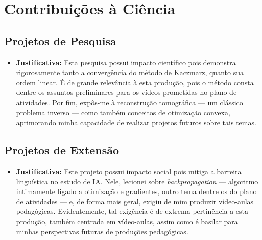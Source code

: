 \section{Contribuições à Ciência}
\subsection{Projetos de Pesquisa}
\begin{itemize}
	\item[$\bullet$]

	\textbf{Justificativa:}
	Esta pesquisa possui impacto científico pois demonstra rigorosamente tanto a convergência do método de Kaczmarz, quanto sua ordem linear.
	É de grande relevância à esta produção, pois o método consta dentre os assuntos preliminares para os vídeos prometidas no plano de atividades.
	Por fim, expôs-me à reconstrução tomográfica --- um clássico problema inverso --- como também conceitos de otimização convexa, aprimorando minha capacidade de realizar projetos futuros sobre tais temas.
\end{itemize}

\subsection{Projetos de Extensão}
\begin{itemize}
	\item[$\bullet$]

	\textbf{Justificativa:}
	Este projeto possui impacto social pois mitiga a barreira linguística no estudo de IA.
		Nele, lecionei sobre \emph{backpropagation} --- algoritmo intimamente ligado a otimização e gradientes, outro tema dentre os do plano de atividades --- e, de forma mais geral, exigiu de mim produzir vídeo-aulas pedagógicas. Evidentemente, tal exigência é de extrema pertinência a esta produção, também centrada em vídeo-aulas,
	assim como é basilar para minhas perspectivas futuras de produções pedagógicas.
\end{itemize}
